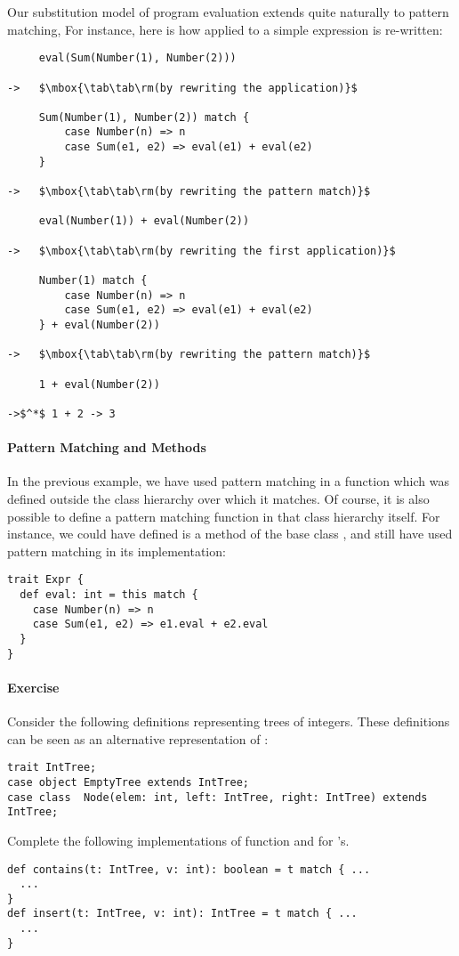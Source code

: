 \documentclass[a4paper,12pt,twoside,titlepage]{book}
\newcommand{\exercise}{\paragraph{Exercise}}
\begin{document}
\example Our substitution model of program evaluation extends quite naturally to pattern matching, For instance, here is how  applied to a simple expression is re-written:
\begin{lstlisting}
     eval(Sum(Number(1), Number(2)))

->   $\mbox{\tab\tab\rm(by rewriting the application)}$

     Sum(Number(1), Number(2)) match {
         case Number(n) => n
         case Sum(e1, e2) => eval(e1) + eval(e2)
     }

->   $\mbox{\tab\tab\rm(by rewriting the pattern match)}$

     eval(Number(1)) + eval(Number(2))

->   $\mbox{\tab\tab\rm(by rewriting the first application)}$

     Number(1) match {
         case Number(n) => n
         case Sum(e1, e2) => eval(e1) + eval(e2)
     } + eval(Number(2))

->   $\mbox{\tab\tab\rm(by rewriting the pattern match)}$

     1 + eval(Number(2))

->$^*$ 1 + 2 -> 3
\end{lstlisting}

\paragraph{Pattern Matching and Methods}
In the previous example, we have used pattern
matching in a function which was defined outside the class hierarchy
over which it matches.  Of course, it is also possible to define a
pattern matching function in that class hierarchy itself. For
instance, we could have defined
 is a method of the base class , and still have used pattern matching in its implementation:
\begin{lstlisting}
trait Expr { 
  def eval: int = this match { 
    case Number(n) => n
    case Sum(e1, e2) => e1.eval + e2.eval 
  } 
}
\end{lstlisting}

\exercise Consider the following definitions representing trees
of integers.  These definitions can be seen as an alternative
representation of :
\begin{lstlisting}
trait IntTree;
case object EmptyTree extends IntTree;
case class  Node(elem: int, left: IntTree, right: IntTree) extends IntTree;
\end{lstlisting}
Complete the following implementations of function  and  for 
's.
\begin{lstlisting} 
def contains(t: IntTree, v: int): boolean = t match { ... 
  ...
}
def insert(t: IntTree, v: int): IntTree = t match { ... 
  ...
}
\end{lstlisting}
\end{document}
